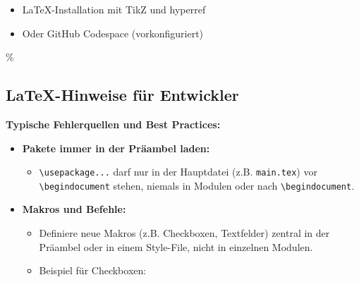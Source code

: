 \begin{itemize}
\tightlist
\item
  LaTeX-Installation mit TikZ und hyperref
\item
  Oder GitHub Codespace (vorkonfiguriert)
\end{itemize}

\hypertarget{latex-hinweise-fuxfcr-entwickler}{\%
\subsection{LaTeX-Hinweise für Entwickler}\label{latex-hinweise-fuxfcr-entwickler}}

\textbf{Typische Fehlerquellen und Best Practices:}

\begin{itemize}
\tightlist
\item
  \textbf{Pakete immer in der Präambel laden:}

  \begin{itemize}
  \tightlist
  \item
    \texttt{\textbackslash{}usepackage{...}} darf nur in der Hauptdatei (z.B. \texttt{main.tex}) vor \texttt{\textbackslash{}begin{document}} stehen, niemals in Modulen oder nach \texttt{\textbackslash{}begin{document}}.
  \end{itemize}
\item
  \textbf{Makros und Befehle:}

  \begin{itemize}
  \item
    Definiere neue Makros (z.B. Checkboxen, Textfelder) zentral in der Präambel oder in einem Style-File, nicht in einzelnen Modulen.
  \item
    Beispiel für Checkboxen:


\end{itemize}
\end{itemize}
